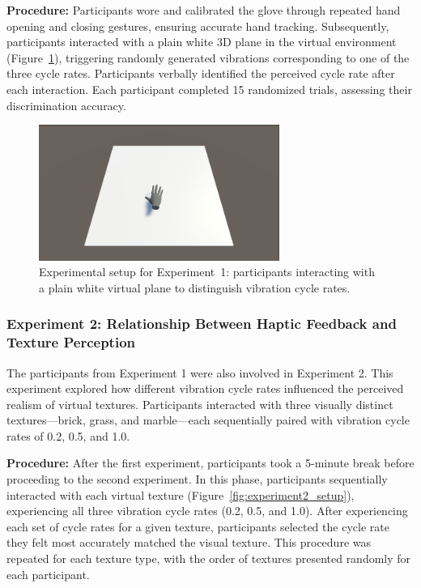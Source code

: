 \documentclass[graybox]{svmult}
\begin{document}
\textbf{Procedure:} Participants wore and calibrated the glove through repeated hand opening and closing gestures, ensuring accurate hand tracking. Subsequently, participants interacted with a plain white 3D plane in the virtual environment (Figure~\ref{fig:experiment1_setup}), triggering randomly generated vibrations corresponding to one of the three cycle rates. Participants verbally identified the perceived cycle rate after each interaction. Each participant completed 15 randomized trials, assessing their discrimination accuracy.

\begin{figure}[H]
	\centering
	\includegraphics[width=0.7\textwidth]{figure/ex1.png}%
	\caption{Experimental setup for Experiment~1: participants interacting with a plain white virtual plane to distinguish vibration cycle rates.}\label{fig:experiment1_setup}
\end{figure}

\subsubsection{Experiment 2: Relationship Between Haptic Feedback and Texture Perception}
The participants from Experiment 1 were also involved in Experiment 2. This experiment explored how different vibration cycle rates influenced the perceived realism of virtual textures. Participants interacted with three visually distinct textures—brick, grass, and marble—each sequentially paired with vibration cycle rates of 0.2, 0.5, and 1.0.

\textbf{Procedure:} After the first experiment, participants took a 5-minute break before proceeding to the second experiment. In this phase, participants sequentially interacted with each virtual texture (Figure~\ref{fig:experiment2_setup}), experiencing all three vibration cycle rates (0.2, 0.5, and 1.0). After experiencing each set of cycle rates for a given texture, participants selected the cycle rate they felt most accurately matched the visual texture. This procedure was repeated for each texture type, with the order of textures presented randomly for each participant.
\end{document}
